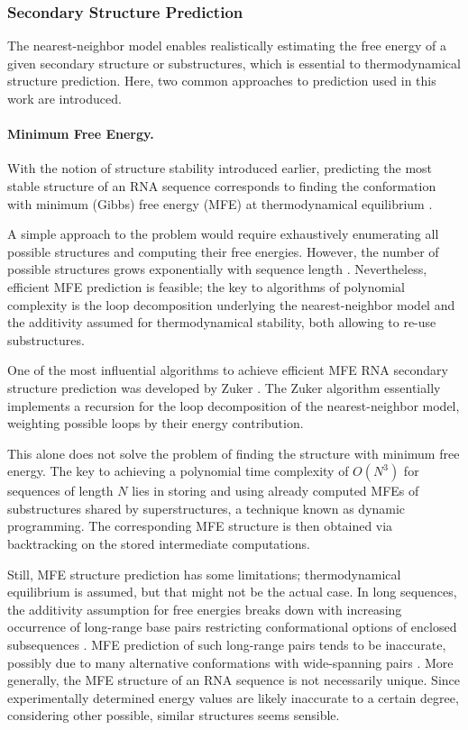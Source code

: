 \documentclass[../../master.tex]{subfiles}
\begin{document}
\subsubsection{Secondary Structure Prediction}
\label{ssub:theory:folding}

The nearest-neighbor model enables realistically estimating the free energy of a given secondary structure or substructures, which is essential to thermodynamical structure prediction.
Here, two common approaches to prediction used in this work are introduced.

\paragraph{Minimum Free Energy.}
\label{par:theory:mfe}

With the notion of structure stability introduced earlier, predicting the most stable structure of an RNA sequence corresponds to finding the conformation with minimum (Gibbs) free energy (MFE) at thermodynamical equilibrium \parencite{tinoco_estimation_1971, zuker_rna_1984}.

A simple approach to the problem would require exhaustively enumerating all possible structures and computing their free energies.
However, the number of possible structures grows exponentially with sequence length \parencite{schuster_sequences_1994}.
Nevertheless, efficient MFE prediction is feasible; the key to algorithms of polynomial complexity is the loop decomposition underlying the nearest-neighbor model and the additivity assumed for thermodynamical stability, both allowing to re-use substructures.

One of the most influential algorithms to achieve efficient MFE RNA secondary structure prediction was developed by Zuker \parencite{zuker_optimal_1981}.
The Zuker algorithm essentially implements a recursion for the loop decomposition of the nearest-neighbor model, weighting possible loops by their energy contribution.

This alone does not solve the problem of finding the structure with minimum free energy.
The key to achieving a polynomial time complexity of $O(N^3)$ for sequences of length $N$ lies in storing and using already computed MFEs of substructures shared by superstructures, a technique known as dynamic programming.
The corresponding MFE structure is then obtained via backtracking on the stored intermediate computations.

Still, MFE structure prediction has some limitations; thermodynamical equilibrium is assumed, but that might not be the actual case.
In long sequences, the additivity assumption for free energies breaks down with increasing occurrence of long-range base pairs restricting conformational options of enclosed subsequences  \parencite{dill_additivity_1997}.
MFE prediction of such long-range pairs tends to be inaccurate, possibly due to many alternative conformations with wide-spanning pairs \parencite{amman_trouble_2013}.
More generally, the MFE structure of an RNA sequence is not necessarily unique.
Since experimentally determined energy values are likely inaccurate to a certain degree, considering other possible, similar structures seems sensible.
\end{document}
